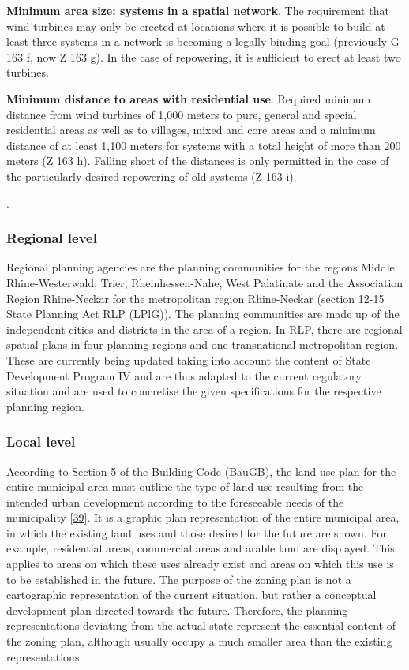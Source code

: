 \documentclass[a4paper,11pt]{article}
\begin{document}
\textbf{Minimum area size: systems in a spatial network}. The requirement that wind turbines may only be erected at locations where it is possible to build at least three systems in a network is becoming a legally binding goal (previously G 163 f, now Z 163 g). In the case of repowering, it is sufficient to erect at least two turbines.

\textbf{Minimum distance to areas with residential use}. Required minimum distance from wind turbines of 1,000 meters to pure, general and special residential areas as well as to villages, mixed and core areas and a minimum distance of at least 1,100 meters for systems with a total height of more than 200 meters (Z 163 h). Falling short of the distances is only permitted in the case of the particularly desired repowering of old systems (Z 163 i).

.

\hypertarget{regional-level}{%
\subsubsection{Regional level}\label{regional-level}}

Regional planning agencies are the planning communities for the regions Middle Rhine-Westerwald, Trier, Rheinhessen-Nahe, West Palatinate and the Association Region Rhine-Neckar for the metropolitan region Rhine-Neckar (section 12-15 State Planning Act RLP (LPlG)). The planning communities are made up of the independent cities and districts in the area of a region. In RLP, there are regional spatial plans in four planning regions and one transnational metropolitan region. These are currently being updated taking into account the content of State Development Program IV and are thus adapted to the current regulatory situation and are used to concretise the given specifications for the respective planning region.

\hypertarget{local-level}{%
\subsubsection{Local level}\label{local-level}}

According to Section 5 of the Building Code (BauGB), the land use plan for the entire municipal area must outline the type of land use resulting from the intended urban development according to the foreseeable needs of the municipality {[}\protect\hyperlink{ref-BundesministeriumderJustizundfurVerbraucherschutz.1960}{39}{]}. It is a graphic plan representation of the entire municipal area, in which the existing land uses and those desired for the future are shown. For example, residential areas, commercial areas and arable land are displayed. This applies to areas on which these uses already exist and areas on which this use is to be established in the future. The purpose of the zoning plan is not a cartographic representation of the current situation, but rather a conceptual development plan directed towards the future. Therefore, the planning representations deviating from the actual state represent the essential content of the zoning plan, although usually occupy a much smaller area than the existing representations.
\end{document}

